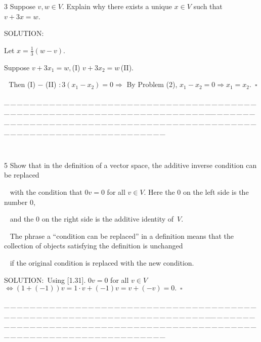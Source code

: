 \documentclass[a4paper, 11pt, UTF8]{article}
\begin{document}
\begin{large}
{\timesbf\Large 3} {\timessl\Large 
Suppose $v, w\in V$. Explain why there exists a unique $x\in V$ such that $v + 3x = w$.
}\par
{\timesbf S\footnotesize{OLUTION:}}\par\quad
[Existence] Let $x=\displaystyle\frac{1}{3}(w-v)$.\par\quad
[Uniqueness] Suppose $v+3x_1=w,$(I)$\,\,v+3x_2=w\,$(II).\par\quad\quad\qquad\qquad\,\, Then (I) $-$ (II) $: 3(x_1-x_2)=0\Rightarrow$ By Problem (2), $x_1-x_2=0\Rightarrow x_1=x_2.\,\,\,\square$\par
{\tiny \_\,\_\,\_\,\_\,\_\,\_\,\_\,\_\,\_\,\_\,\_\,\_\,\_\,\_\,\_\,\_\,\_\,\_\,\_\,\_\,\_\,\_\,\_\,\_\,\_\,\_\,\_\,\_\,\_\,\_\,\_\,\_\,\_\,\_\,\_\,\_\,\_\,\_\,\_\,\_\,\_\,\_\,\_\,\_\,\_\,\_\,\_\,\_\,\_\,\_\,\_\,\_\,\_\,\_\,\_\,\_\,\_\,\_\,\_\,\_\,\_\,\_\,\_\,\_\,\_\,\_\,\_\,\_\,\_\,\_\,\_\_\,\_\,\_\,\_\,\_\,\_\,\_\,\_\,\_\,\_\,\_\,\_\,\_\,\_\,\_\,\_\,\_\,\_\,\_\,\_\,\_\,\_\,\_\,\_\,\_\,\_\,\_\,\_\,\_\,\_\,\_\,\_\,\_\,\_\,\_\,\_\,\_\,\_\,\_\,\_\,\_\,\_\,\_\,\_\,\_\,\_\,\_\,\_\,\_\,\_\,\_\,\_\,\_\,\_\,\_\,\_\,\_\,\_\,\_\,\_\,\_\,\_\,\_\,\_\,\_\,\_\,\_\,\_\,\_\,\_\,\_}{\tiny\,\par}

{\timesbf\Large 5} {\timessl\Large 
Show that in the definition of a vector space, the additive inverse condition can be replaced}\par\,\,\,
{\timessl\Large with the condition that $0v = 0$ for all $v\in V$. Here the $0$ on the left side is the number $0$, }\par\,\,\,
{\timessl\Large and the $0$ on the right side is the additive identity of \,$V$.
}\par\,\,\,
{\timessl\small The phrase a “condition can be replaced” in a definition means that the collection of objects satisfying the definition is unchanged}\par\,\,\,
{\timessl\small if the original condition is replaced with the new condition.}\par
{\timesbf S\footnotesize{OLUTION:}}\,\,\,Using [1.31]. $0v = 0$ for all $v\in V$ $\Leftrightarrow (1+(-1))v=1\cdot v+(-1)v=v+(-v)=0.\,\,\,\square$\par
{\tiny \_\,\_\,\_\,\_\,\_\,\_\,\_\,\_\,\_\,\_\,\_\,\_\,\_\,\_\,\_\,\_\,\_\,\_\,\_\,\_\,\_\,\_\,\_\,\_\,\_\,\_\,\_\,\_\,\_\,\_\,\_\,\_\,\_\,\_\,\_\,\_\,\_\,\_\,\_\,\_\,\_\,\_\,\_\,\_\,\_\,\_\,\_\,\_\,\_\,\_\,\_\,\_\,\_\,\_\,\_\,\_\,\_\,\_\,\_\,\_\,\_\,\_\,\_\,\_\,\_\,\_\,\_\,\_\,\_\,\_\,\_\_\,\_\,\_\,\_\,\_\,\_\,\_\,\_\,\_\,\_\,\_\,\_\,\_\,\_\,\_\,\_\,\_\,\_\,\_\,\_\,\_\,\_\,\_\,\_\,\_\,\_\,\_\,\_\,\_\,\_\,\_\,\_\,\_\,\_\,\_\,\_\,\_\,\_\,\_\,\_\,\_\,\_\,\_\,\_\,\_\,\_\,\_\,\_\,\_\,\_\,\_\,\_\,\_\,\_\,\_\,\_\,\_\,\_\,\_\,\_\,\_\,\_\,\_\,\_\,\_\,\_\,\_\,\_\,\_\,\_\,\_}{\tiny\,\par}


\end{large}
\end{document}
